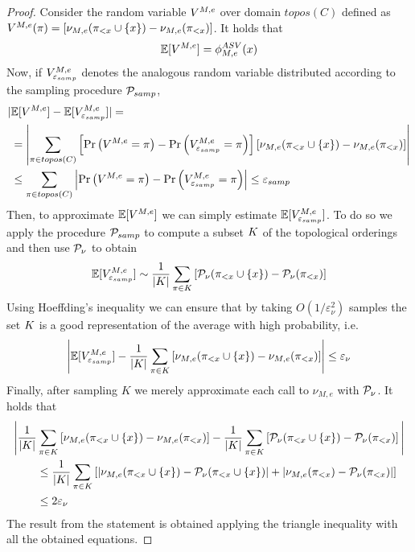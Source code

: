 \documentclass{llncs}
\begin{document}
\begin{proof}
	Consider the random variable $V^{M,e}$ over domain $topos(C)$ defined as $V^{M,e}(\pi) = \left[ \nu_{M,e}(\pi_{<x} \cup \{x\}) - \nu_{M,e}(\pi_{<x}) \right]$. It holds that
	\begin{align*}
		\mathbb{E}[V^{M,e}] = \phi^{ASV}_{M,e}(x)
	\end{align*}
	Now, if $V^{M,e}_{\varepsilon_{samp}}$ denotes the analogous random variable distributed according to the sampling procedure $\mathcal{P}_{samp}$,
	\begin{align*}
		|&\mathbb{E}[V^{M,e}] - \mathbb{E}[V^{M,e}_{\varepsilon_{samp}}]| = \\
		&= \left|\sum_{\pi \in topos(C)} \left[\Pr\left( V^{M,e} = \pi \right) - \Pr\left( V^{M,e}_{\varepsilon_{samp}} = \pi \right) \right] \left[ \nu_{M,e}(\pi_{<x} \cup \{x\}) - \nu_{M,e}(\pi_{<x}) \right] \right|\\
		&\leq \sum_{\pi \in topos(C)} \left|\Pr\left( V^{M,e} = \pi \right) - \Pr\left( V^{M,e}_{\varepsilon_{samp}} = \pi \right) \right| \leq \varepsilon_{samp}
	\end{align*}
	Then, to approximate $\mathbb{E}[V^{M,e}]$ we can simply estimate $\mathbb{E}[V^{M,e}_{\varepsilon_{samp}}]$. To do so we apply the procedure $\mathcal{P}_{samp}$ to compute a subset $K$ of the topological orderings and then use $\mathcal{P}_{\nu}$ to obtain
	\begin{align*}
		\mathbb{E}[V^{M,e}_{\varepsilon_{samp}}] \sim \frac{1}{|K|} \sum_{\pi \in K} \left[ \mathcal{P}_{\nu}(\pi_{<x} \cup \{x\}) - \mathcal{P}_{\nu}(\pi_{<x}) \right]
	\end{align*}
	Using Hoeffding's inequality \parencite{hoeffding1963probability} we can ensure that by taking $O(1/\varepsilon_{\nu}^2)$ samples the set $K$ is a good representation of the average with high probability, i.e.
	\begin{align*}
		\left|\mathbb{E}[V^{M,e}_{\varepsilon_{samp}}] - \frac{1}{|K|} \sum_{\pi \in K} \left[ \nu_{M,e}(\pi_{<x} \cup \{x\}) - \nu_{M,e}(\pi_{<x}) \right]\right| \leq \varepsilon_\nu
	\end{align*}
	Finally, after sampling $K$ we merely approximate each call to $\nu_{M,e}$ with $\mathcal{P}_{\nu}$. It holds that
	\begin{align*}
		\Bigg| \frac{1}{|K|} &\sum_{\pi \in K} \left[ \nu_{M,e}(\pi_{<x} \cup \{x\}) - \nu_{M,e}(\pi_{<x}) \right] - \frac{1}{|K|} \sum_{\pi \in K} \left[ \mathcal{P}_{\nu}(\pi_{<x} \cup \{x\}) - \mathcal{P}_{\nu}(\pi_{<x}) \right]\Bigg|\\
		&\leq \frac{1}{|K|} \sum_{\pi \in K} \left[ |\nu_{M,e}(\pi_{<x} \cup \{x\}) - \mathcal{P}_{\nu}(\pi_{<x} \cup \{x\})| + |\nu_{M,e}(\pi_{<x}) - \mathcal{P}_{\nu}(\pi_{<x})| \right]\\
		&\leq 2 \varepsilon_{\nu}
	\end{align*}
	The result from the statement is obtained applying the triangle inequality with all the obtained equations.
\end{proof}

\vspace{0.5cm}
\setcounter{page}{1}

%
%
\printbibliography
\end{document}
